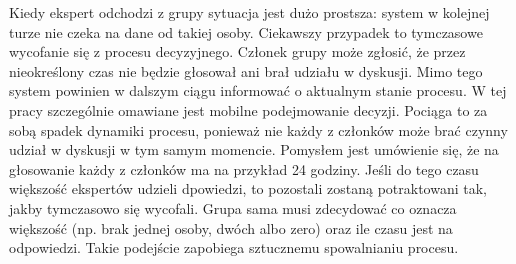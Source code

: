 Kiedy ekspert odchodzi z grupy sytuacja jest dużo prostsza: system w kolejnej 
turze nie czeka na dane od takiej osoby. Ciekawszy przypadek to tymczasowe 
wycofanie się z procesu decyzyjnego. Członek grupy może zgłosić, że przez 
nieokreślony czas nie będzie głosował ani brał udziału w dyskusji. Mimo tego 
system powinien w dalszym ciągu informować o aktualnym stanie procesu. W tej 
pracy szczególnie omawiane jest mobilne podejmowanie decyzji. Pociąga to za
sobą spadek dynamiki procesu, ponieważ nie każdy z członków może brać czynny
udział w dyskusji w tym samym momencie. Pomysłem jest umówienie się, że na
głosowanie każdy z członków ma na przykład 24 godziny. Jeśli do tego czasu
większość ekspertów udzieli  dpowiedzi, to pozostali zostaną potraktowani tak,
jakby tymczasowo się wycofali. Grupa sama musi zdecydować co oznacza większość
(np. brak jednej osoby, dwóch albo zero) oraz ile czasu jest na odpowiedzi.
Takie podejście zapobiega sztucznemu spowalnianiu procesu.


